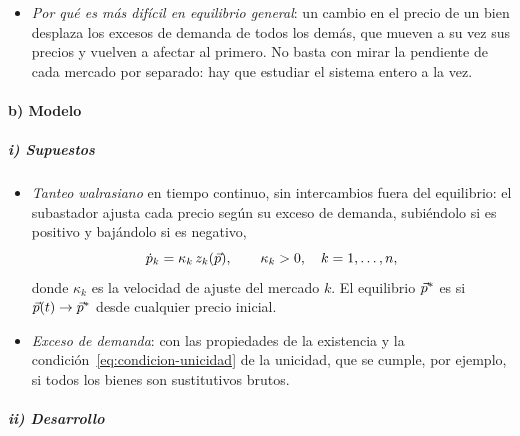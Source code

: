 \documentclass[11pt]{article}
\begin{document}
\begin{itemize}
\begin{itemize}
  \item {} (por cantidades): la cantidad aumenta si lo que los compradores están dispuestos a pagar supera lo que piden los vendedores.
  \end{itemize}
  En un solo mercado los 2~pueden dar resultados opuestos (anexo~\ref{anexo:estabilidad-parcial}) . En equilibrio general se estudia el walrasiano, porque en el modelo la variable de ajuste son los precios (\ref{sec:supuestos}).
\item \emph{Por qué es más difícil en equilibrio general}: un cambio en el precio de un bien desplaza los excesos de demanda de todos los demás, que mueven a su vez sus precios y vuelven a afectar al primero. No basta con mirar la pendiente de cada mercado por separado: hay que estudiar el sistema entero a la vez.
\end{itemize}

\paragraph{b) Modelo}

\subparagraph{i) Supuestos}

\begin{itemize}
\item \emph{Tanteo walrasiano} en tiempo continuo, sin intercambios fuera del equilibrio: el subastador ajusta cada precio según su exceso de demanda, subiéndolo si es positivo y bajándolo si es negativo,
  \begin{equation}
  \dot p_k=\kappa_k\,z_k(\vec{p}),\qquad \kappa_k>0,\quad k=1,\dots,n, \label{eq:tatonnement}
  \end{equation}
  donde $\kappa_k$ es la velocidad de ajuste del mercado $k$. El equilibrio $\vec{p}^*$ es  si $\vec{p}(t)\to\vec{p}^*$ desde cualquier precio inicial.
\item \emph{Exceso de demanda}: con las propiedades de la existencia y la condición~\eqref{eq:condicion-unicidad} de la unicidad, que se cumple, por ejemplo, si todos los bienes son sustitutivos brutos.
\end{itemize}

\subparagraph{ii) Desarrollo}
\end{document}
